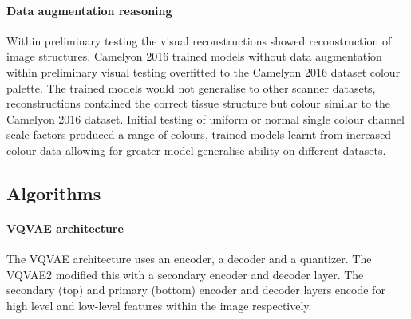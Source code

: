 \documentclass[review]{elsarticle}
\begin{document}
\paragraph{Data augmentation reasoning} Within preliminary testing the visual reconstructions showed reconstruction of image structures. Camelyon 2016 trained models without data augmentation within preliminary visual testing overfitted to the Camelyon 2016 dataset colour palette. The trained models would not generalise to other scanner datasets, reconstructions contained the correct tissue structure but colour similar to the Camelyon 2016 dataset. Initial testing of uniform or normal single colour channel scale factors produced a range of colours, trained models learnt from increased colour data allowing for greater model generalise-ability on different datasets.
\subsection{Algorithms}
\paragraph{VQVAE architecture} The VQVAE architecture uses an encoder, a decoder and a quantizer. The VQVAE2 modified this with a secondary encoder and decoder layer. The secondary (top) and primary (bottom) encoder and decoder layers encode for high level and low-level features within the image respectively.

\end{document}
